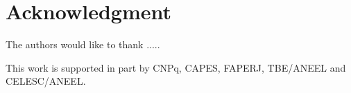 \documentclass[conference]{IEEEtran}
\begin{document}

%



\section*{Acknowledgment}


The authors would like to thank .....

This work is supported in part by CNPq, CAPES, FAPERJ, TBE/ANEEL and CELESC/ANEEL.


\ifCLASSOPTIONcaptionsoff
  \newpage
\fi





%
%
%


\end{document}
